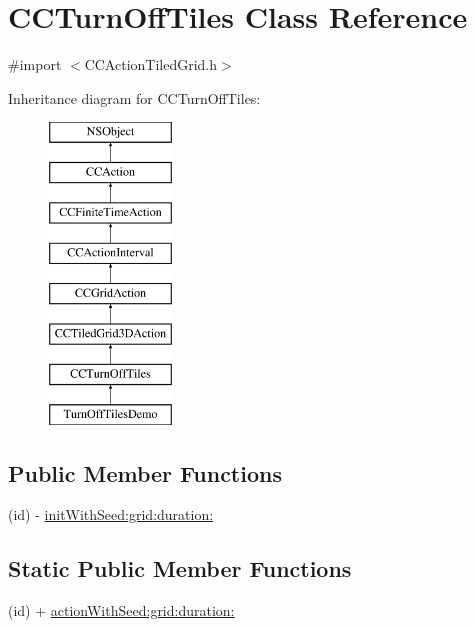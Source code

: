 \hypertarget{interface_c_c_turn_off_tiles}{\section{C\-C\-Turn\-Off\-Tiles Class Reference}
\label{interface_c_c_turn_off_tiles}
}


{\ttfamily \#import $<$C\-C\-Action\-Tiled\-Grid.\-h$>$}

Inheritance diagram for C\-C\-Turn\-Off\-Tiles\-:\begin{figure}[H]
\begin{center}
\leavevmode
\includegraphics[height=8.000000cm]{interface_c_c_turn_off_tiles}
\end{center}
\end{figure}
\subsection*{Public Member Functions}
\begin{DoxyCompactItemize}
\item 
(id) -\/ \hyperlink{interface_c_c_turn_off_tiles_ae91fc94be17f78980ab010f5b4c394af}{init\-With\-Seed\-:grid\-:duration\-:}
\end{DoxyCompactItemize}
\subsection*{Static Public Member Functions}
\begin{DoxyCompactItemize}
\item 
(id) + \hyperlink{interface_c_c_turn_off_tiles_ac16a90a7eff2ca3ffe14be167a8471a4}{action\-With\-Seed\-:grid\-:duration\-:}
\end{DoxyCompactItemize}
